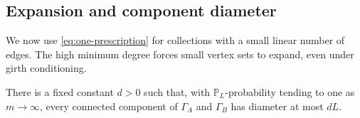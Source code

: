 \subsection{Expansion and component diameter}

We now use \eqref{eq:one-prescription} for collections with a small
linear number of edges.  The high minimum degree forces small vertex
sets to expand, even under girth conditioning.

\begin{proposition}\label{prop:diameter}
There is a fixed constant \(d>0\) such that, with
\(\mathbb P_L\)-probability tending to one as \(m\to\infty\), every
connected component of \(\Gamma_A\) and \(\Gamma_B\) has diameter
at most \(dL\).
\end{proposition}

